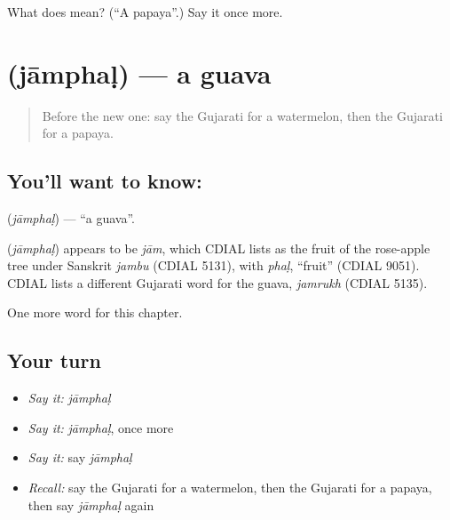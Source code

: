 \begin{tcolorbox}[breakable,colback=teal!4,colframe=teal!35!black,title={Before you move on}]
What does  mean? (\textquotedblleft{}A papaya\textquotedblright{}.) Say it once more.
\end{tcolorbox}
\section[\texorpdfstring{\gu{જામફળ} (jāmphaḷ)}{જામફળ (jāmphaḷ)}]{ (jāmphaḷ) — a guava}

\label{lesson:GU-C116-jamphal}



\begin{quote}
Before the new one: say the Gujarati for a watermelon, then the Gujarati for a papaya.
\end{quote}

\subsection*{You'll want to know: }
\textbf{} (\emph{jāmphaḷ}) — \textquotedblleft{}a guava\textquotedblright{}.

\begin{cousinweb}
\textbf{} (\emph{jāmphaḷ}) appears to be \emph{jām}, which CDIAL lists as the fruit of the rose-apple tree under Sanskrit \emph{jambu} (CDIAL 5131), with \emph{phaḷ}, \textquotedblleft{}fruit\textquotedblright{} (CDIAL 9051). CDIAL lists a different Gujarati word for the guava, \emph{jamrukh} (CDIAL 5135).
\end{cousinweb}

\begin{grammarlens}[title={What you've built}]
One more word for this chapter.
\end{grammarlens}

\subsection*{Your turn}
\begin{itemize}
\raggedright
  \item \emph{Say it:} \emph{jāmphaḷ}
  \item \emph{Say it:} \emph{jāmphaḷ}, once more
  \item \emph{Say it:} say \emph{jāmphaḷ}
  \item \emph{Recall:} say the Gujarati for a watermelon, then the Gujarati for a papaya, then say \emph{jāmphaḷ} again
\end{itemize}

